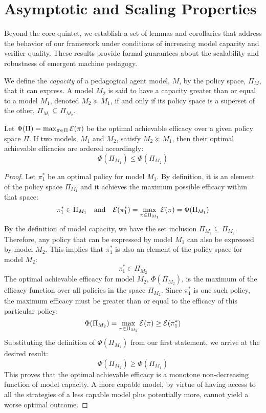 \section{Asymptotic and Scaling Properties}

Beyond the core quintet, we establish a set of lemmas and corollaries that address the behavior of our framework under conditions of increasing model capacity and verifier quality. These results provide formal guarantees about the scalability and robustness of emergent machine pedagogy.

\begin{definition}
We define the \emph{capacity} of a pedagogical agent model, $M$, by the policy space, $\Pi_M$, that it can express. A model $M_2$ is said to have a capacity greater than or equal to a model $M_1$, denoted $M_2 \succeq M_1$, if and only if its policy space is a superset of the other, $\Pi_{M_1} \subseteq \Pi_{M_2}$.
\end{definition}

\begin{lemma}
\label{lem:capacity_monotonicity}
Let $\Phi(\Pi) = \max_{\pi \in \Pi} \mathcal{E}(\pi)$ be the optimal achievable efficacy over a given policy space $\Pi$. If two models, $M_1$ and $M_2$, satisfy $M_2 \succeq M_1$, then their optimal achievable efficacies are ordered accordingly:
\[ \Phi(\Pi_{M_1}) \le \Phi(\Pi_{M_2}) \]
\end{lemma}
\begin{proof}
Let $\pi_1^*$ be an optimal policy for model $M_1$. By definition, it is an element of the policy space $\Pi_{M_1}$ and it achieves the maximum possible efficacy within that space:
\[ \pi_1^* \in \Pi_{M_1} \quad \text{and} \quad \mathcal{E}(\pi_1^*) = \max_{\pi \in \Pi_{M_1}} \mathcal{E}(\pi) = \Phi(\Pi_{M_1}) \]
By the definition of model capacity, we have the set inclusion $\Pi_{M_1} \subseteq \Pi_{M_2}$. Therefore, any policy that can be expressed by model $M_1$ can also be expressed by model $M_2$. This implies that $\pi_1^*$ is also an element of the policy space for model $M_2$:
\[ \pi_1^* \in \Pi_{M_2} \]
The optimal achievable efficacy for model $M_2$, $\Phi(\Pi_{M_2})$, is the maximum of the efficacy function over all policies in the space $\Pi_{M_2}$. Since $\pi_1^*$ is one such policy, the maximum efficacy must be greater than or equal to the efficacy of this particular policy:
\[ \Phi(\Pi_{M_2}) = \max_{\pi \in \Pi_{M_2}} \mathcal{E}(\pi) \ge \mathcal{E}(\pi_1^*) \]
Substituting the definition of $\Phi(\Pi_{M_1})$ from our first statement, we arrive at the desired result:
\[ \Phi(\Pi_{M_2}) \ge \Phi(\Pi_{M_1}) \]
This proves that the optimal achievable efficacy is a monotone non-decreasing function of model capacity. A more capable model, by virtue of having access to all the strategies of a less capable model plus potentially more, cannot yield a worse optimal outcome.
\end{proof}

